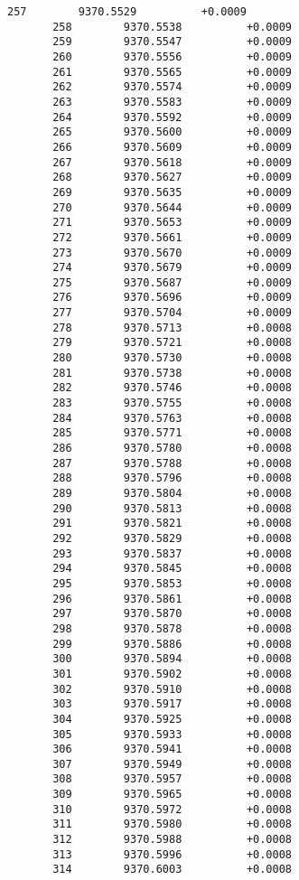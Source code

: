 \documentclass[11pt]{article}
\begin{document}
\begin{Verbatim}[commandchars=\\\{\}]
       257        9370.5529          +0.0009
       258        9370.5538          +0.0009
       259        9370.5547          +0.0009
       260        9370.5556          +0.0009
       261        9370.5565          +0.0009
       262        9370.5574          +0.0009
       263        9370.5583          +0.0009
       264        9370.5592          +0.0009
       265        9370.5600          +0.0009
       266        9370.5609          +0.0009
       267        9370.5618          +0.0009
       268        9370.5627          +0.0009
       269        9370.5635          +0.0009
       270        9370.5644          +0.0009
       271        9370.5653          +0.0009
       272        9370.5661          +0.0009
       273        9370.5670          +0.0009
       274        9370.5679          +0.0009
       275        9370.5687          +0.0009
       276        9370.5696          +0.0009
       277        9370.5704          +0.0009
       278        9370.5713          +0.0008
       279        9370.5721          +0.0008
       280        9370.5730          +0.0008
       281        9370.5738          +0.0008
       282        9370.5746          +0.0008
       283        9370.5755          +0.0008
       284        9370.5763          +0.0008
       285        9370.5771          +0.0008
       286        9370.5780          +0.0008
       287        9370.5788          +0.0008
       288        9370.5796          +0.0008
       289        9370.5804          +0.0008
       290        9370.5813          +0.0008
       291        9370.5821          +0.0008
       292        9370.5829          +0.0008
       293        9370.5837          +0.0008
       294        9370.5845          +0.0008
       295        9370.5853          +0.0008
       296        9370.5861          +0.0008
       297        9370.5870          +0.0008
       298        9370.5878          +0.0008
       299        9370.5886          +0.0008
       300        9370.5894          +0.0008
       301        9370.5902          +0.0008
       302        9370.5910          +0.0008
       303        9370.5917          +0.0008
       304        9370.5925          +0.0008
       305        9370.5933          +0.0008
       306        9370.5941          +0.0008
       307        9370.5949          +0.0008
       308        9370.5957          +0.0008
       309        9370.5965          +0.0008
       310        9370.5972          +0.0008
       311        9370.5980          +0.0008
       312        9370.5988          +0.0008
       313        9370.5996          +0.0008
       314        9370.6003          +0.0008

\end{Verbatim}
\end{document}
